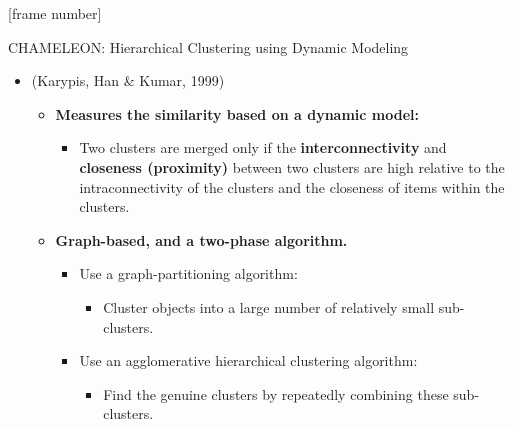 \documentclass[aspectratio=169,t,xcolor=dvipsnames]{beamer}
\begin{document}
  { %
    [frame number]
    \begin{frame}{CHAMELEON: Hierarchical Clustering using Dynamic Modeling}
      \begin{itemize}
        \item (Karypis, Han \& Kumar, 1999)
        \begin{itemize}
          \item \textbf{Measures the similarity based on a dynamic model:}
          \begin{itemize}
            \item Two clusters are merged only if the \textbf{interconnectivity} and \textbf{closeness (proximity)} between two clusters are high relative to the intraconnectivity of the clusters and the closeness of items within the clusters.
          \end{itemize}
          \item \textbf{Graph-based, and a two-phase algorithm.}
          \begin{itemize}
            \item Use a graph-partitioning algorithm:
            \begin{itemize}
              \item Cluster objects into a large number of relatively small sub-clusters.
            \end{itemize}
            \item Use an agglomerative hierarchical clustering algorithm:
            \begin{itemize}
              \item Find the genuine clusters by repeatedly combining these sub-clusters.
            \end{itemize}
          \end{itemize}
        \end{itemize}
      \end{itemize}
    \end{frame}
  }
\end{document}

